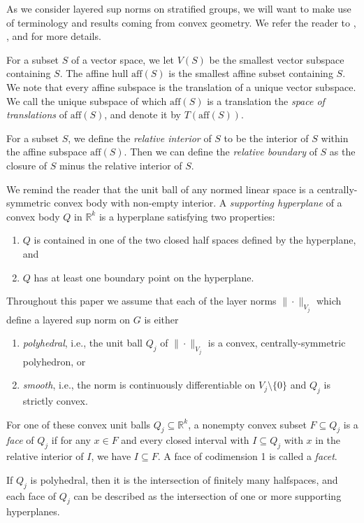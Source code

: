 \documentclass{article}
\theoremstyle{definition}
\newcommand{\norm}[1]{\|#1\|}
\newcommand{\aff}{\mathrm{aff}}
\newcommand{\R}{{\mathbb R}}
\begin{document}
As we consider layered sup norms on stratified groups, we will want to make use of terminology and results coming from convex geometry. We refer the reader to \cite{beer-convex}, \cite{rockafellar-convex}, and \cite{schilling-thesis} for more details. 

For a subset $S$ of a vector space, we let $V(S)$ be the smallest vector subspace containing $S$. The affine hull $\aff(S)$ is the smallest affine subset containing $S$. We note that every affine subspace is the translation of a unique vector subspace. We call the unique subspace of which $\aff(S)$ is a translation the {\em space of translations} of $\aff(S)$, and denote it by $T(\aff(S))$.

For a subset $S$, we define the {\em relative interior} of $S$ to be the interior of $S$ within the affine subspace $\aff(S)$. Then we can define the {\em relative boundary} of $S$ as the closure of $S$ minus the relative interior of $S$.

We remind the reader that the unit ball of any normed linear space is a centrally-symmetric convex body with non-empty interior. A {\em supporting hyperplane} of a convex body $Q$ in $\R^k$ is a hyperplane satisfying two properties:
\begin{enumerate}
\item $Q$ is contained in one of the two closed half spaces defined by the hyperplane, and
\item $Q$ has at least one boundary point on the hyperplane.
\end{enumerate}

Throughout this paper we assume that each of the layer norms $\norm{\cdot}_{V_j}$ which define a layered sup norm on $G$ is either
\begin{enumerate}
\item {\em polyhedral}, i.e., the unit ball $Q_j$ of $\norm{\cdot}_{V_j}$ is a convex, centrally-symmetric polyhedron, or
\item {\em smooth}, i.e., the norm is continuously differentiable on $V_j \setminus \{0\}$ and $Q_j$ is strictly convex.
\end{enumerate}

For one of these convex unit balls $Q_j \subseteq \R^k$, a nonempty convex subset $F \subseteq Q_j$ is a {\em face} of $Q_j$ if for any $x \in F$ and every closed interval with $I \subseteq Q_j$ with $x$ in the relative interior of $I$, we have $I \subseteq F$. A face of codimension 1 is called a {\em facet}.

If $Q_j$ is polyhedral, then it is the intersection of finitely many halfspaces, and each face of $Q_j$ can be described as the intersection of one or more supporting hyperplanes.
\end{document}
